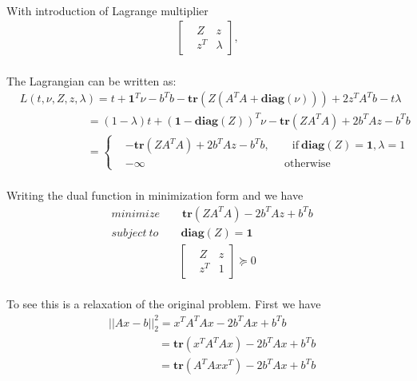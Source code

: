 \paragraph{}
With introduction of Lagrange multiplier
\begin{align*}
\begin{bmatrix}
&Z&z\\&z^T&\lambda
\end{bmatrix},
\end{align*}
\paragraph{}
The Lagrangian can be written as:
\begin{align*}
&L(t,\nu,Z,z,\lambda)=t+\textbf{1}^T\nu-b^Tb-\textbf{tr}(Z(A^TA+\textbf{diag}(\nu)))+2z^TA^Tb -t\lambda\\
&\qquad \qquad \qquad = (1-\lambda)t +(\textbf{1}-\textbf{diag}(Z))^T\nu -\textbf{tr}(ZA^TA)+2b^TAz -b^Tb\\
&\qquad \qquad \qquad =\begin{cases}
&-\textbf{tr}(ZA^TA)+2b^TAz -b^Tb, \qquad \text{if}\ \textbf{diag}(Z)=\textbf{1}, \lambda=1\\
&-\infty \qquad  \qquad \qquad \qquad \qquad \qquad \ \ \text{otherwise}
\end{cases}
\end{align*}
\paragraph{}
Writing the dual function in minimization form and we have
\begin{align*}
&minimize \qquad \textbf{tr}(ZA^TA)-2b^TAz + b^Tb\\
&subject\ to \qquad \textbf{diag}(Z)=\textbf{1}\\
&\qquad \qquad \qquad \begin{bmatrix}
&Z&z\\&z^T&1
\end{bmatrix} \succeq 0
\end{align*}
\paragraph{}
To see this is a relaxation of the original problem. First we have
\begin{align*}
&||Ax-b||^2_2 = x^TA^TAx -2b^TAx+b^Tb\\
&\qquad \qquad \ \ =\textbf{tr}(x^TA^TAx) -2b^TAx +b^Tb\\
&\qquad \qquad \ \ =\textbf{tr}(A^TAxx^T) -2b^TAx +b^Tb
\end{align*}
